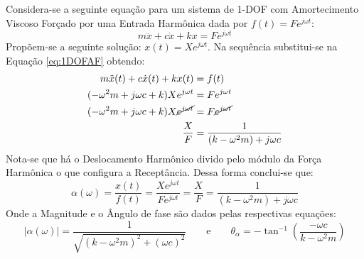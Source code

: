 \documentclass{article}
\begin{document}
\begin{resolution}
    Considera-se a seguinte equação para um sistema de 1-DOF com Amortecimento Viscoso Forçado por uma Entrada Harmônica dada por $f(t) = F e^{j\omega t}$:
    \begin{equation}
        m\ddot{x} + c\dot{x} + k x = F e^{j\omega t}\label{eq:1DOFAF}
    \end{equation}
    \noindent Propõem-se a seguinte solução: $x(t) = X e^{j\omega t}$. Na sequência substitui-se na Equação \ref{eq:1DOFAF} obtendo:
    \begin{align*}
        m\ddot{x}(t) + c\dot{x}(t) + k x(t) &= f(t)\\
        (-\omega^2 m + j \omega c + k) X e^{j\omega t} &= F e^{j\omega t}\\
        (-\omega^2 m + j \omega c + k) X \cancel{e^{j\omega t}} &= F \cancel{e^{j\omega t}}\\
        \frac{X}{F} &= \frac{1}{(k -\omega^2 m) + j \omega c}
    \end{align*}
    Nota-se que há o Deslocamento Harmônico divido pelo módulo da Força Harmônica o que configura a Receptância. Dessa forma conclui-se que:
    \begin{equation}
        \boxed{
            \alpha (\omega) = 
            \frac{x(t)}{f(t)} = 
            \frac{X e^{j\omega t}}{F e^{j\omega t}} = 
            \frac{X}{F} = 
            \frac{1}{(k -\omega^2 m) + j \omega c}
        }
    \end{equation}
    Onde a Magnitude e o Ângulo de fase são dados pelas respectivas equações:
    \begin{equation}
        |\alpha(\omega)| = \frac{1}{\sqrt{(k-\omega^2m)^2 + (\omega c)^2}}
        \qquad \text{e} \qquad
        \theta_{\alpha} = - \tan^{-1}\left( \frac{-\omega c}{k - \omega^2 m} \right)
    \end{equation}
\end{resolution}
\end{document}
